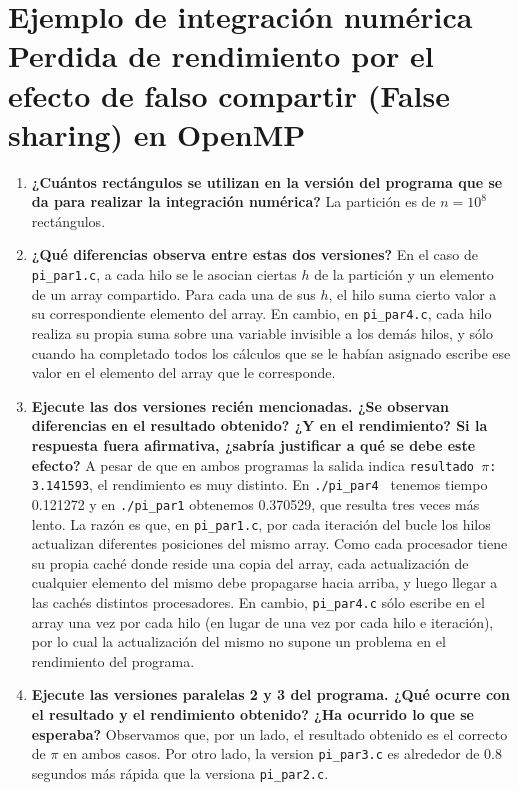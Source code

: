 \documentclass{report}
\newcommand\tab[1][0.6cm]{\hspace*{#1}}
\newcommand\nl{\newline\tab}
\begin{document}
	\section{Ejemplo de integración numérica \newline Perdida de rendimiento por el efecto de falso compartir (False
		sharing) en OpenMP}
	\begin{enumerate}
		\item {\textbf{\tab ¿Cuántos rectángulos se utilizan en la versión del programa que se da para realizar la integración numérica?}\nl
			La partición es de $ n=10^8 $ rectángulos.
		}
		\item {\textbf{\tab ¿Qué diferencias observa entre estas dos versiones?}\nl
			En el caso de \texttt{pi\_par1.c}, a cada hilo se le asocian ciertas $h$ de la partición y un elemento de un array compartido. Para cada una de sus $h$, el hilo suma cierto valor a su correspondiente elemento del array.\nl
			En cambio, en \texttt{pi\_par4.c}, cada hilo realiza su propia suma sobre una variable invisible a los demás hilos, y sólo cuando ha completado todos los cálculos que se le habían asignado escribe ese valor en el elemento del array que le corresponde. 
		}
		\item {\textbf{\tab Ejecute las dos versiones recién mencionadas. ¿Se observan diferencias en el resultado obtenido? ¿Y en el rendimiento? Si la respuesta fuera afirmativa, ¿sabría justificar a qué se debe este efecto?}\nl
			A pesar de que en ambos programas la salida indica \texttt{resultado $\pi$: 3.141593}, el rendimiento es muy distinto. En \texttt{./pi\_par4 } tenemos tiempo 0.121272 y en \texttt{./pi\_par1} obtenemos  0.370529, que resulta tres veces más lento.\nl
			La razón es que, en \texttt{pi\_par1.c}, por cada iteración del bucle los hilos actualizan diferentes posiciones del mismo array. Como cada procesador tiene su propia caché donde reside una copia del array, cada actualización de cualquier elemento del mismo debe propagarse hacia arriba, y luego llegar a las cachés distintos procesadores. En cambio, \texttt{pi\_par4.c} sólo escribe en el array una vez por cada hilo (en lugar de una vez por cada hilo e iteración), por lo cual la actualización del mismo no supone un problema en el rendimiento del programa.
		}
		\item{\textbf{\tab Ejecute las versiones paralelas 2 y 3 del programa. ¿Qué ocurre con el resultado y el rendimiento obtenido? ¿Ha ocurrido lo que se esperaba?}\nl
			Observamos que, por un lado, el resultado obtenido es el correcto de $\pi$ en ambos casos. Por otro lado, la version \texttt{pi\_par3.c} es alrededor de 0.8 segundos más rápida que la versiona \texttt{pi\_par2.c}.\nl
}
\end{enumerate}
\end{document}
